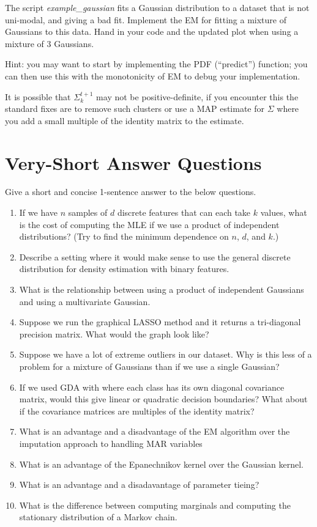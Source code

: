 \documentclass{article}
\def\blu#1{{\color{blu}#1}}
\def\enum#1{\begin{enumerate}#1\end{enumerate}}
\begin{document}
The script \emph{example\_gaussian} fits a Gaussian distribution to a dataset that is not uni-modal, and giving a bad fit. Implement the EM for fitting a mixture of Gaussians to this data. \blu{Hand in your code and the updated plot when using a mixture of 3 Gaussians}.

Hint: you may want to start by implementing the PDF (``predict'') function; you can then use this with the monotonicity of EM to debug your implementation.

It is possible that $\Sigma_k^{t+1}$ may not be positive-definite, if you encounter this the standard fixes are to remove such clusters or use a MAP estimate for $\Sigma$ where you add a small multiple of the identity matrix to the estimate.


\section{Very-Short Answer Questions}


Give a short and concise 1-sentence answer to the below questions.
\enum{
\item If we have $n$ samples of $d$ discrete features that can each take $k$ values, what is the cost of computing the MLE if we use a product of independent distributions? (Try to find the minimum dependence on $n$, $d$, and $k$.)
\item Describe a setting where it would make sense to use the general discrete distribution for density estimation with binary features.
\item What is the relationship between using a product of independent Gaussians and using a multivariate Gaussian.
\item Suppose we run the graphical LASSO method and it returns a tri-diagonal precision matrix. What would the graph look like?
\item Suppose we have a lot of extreme outliers in our dataset. Why is this less of a problem for a mixture of Gaussians than if we use a single Gaussian?
\item If we used GDA with where each class has its own diagonal covariance matrix, would this give linear or quadratic decision boundaries? What about if the covariance matrices are multiples of the identity matrix?
\item What is an advantage and a disadvantage of the EM algorithm over the imputation approach to handling MAR variables
\item What is an advantage of the Epanechnikov kernel over the Gaussian kernel.
\item What is an advantage and a disadavantage of parameter tieing?
\item What is the difference between computing marginals and computing the stationary distribution of a Markov chain.
}
\end{document}
